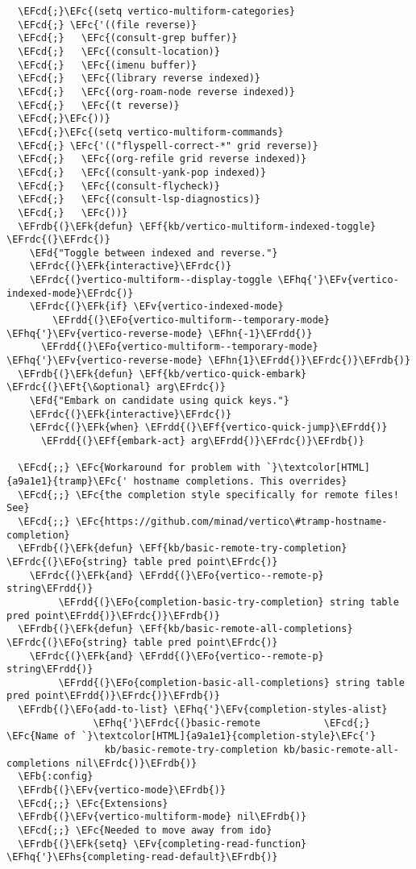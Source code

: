 \documentclass[a4wide,10pt]{article}
\newcommand{\EFc}[1]{\textcolor{EFc}{#1}} %
\newcommand{\EFcd}[1]{\textcolor{EFcd}{#1}} %
\newcommand{\EFd}[1]{\textcolor{EFd}{#1}} %
\newcommand{\EFk}[1]{\textcolor{EFk}{#1}} %
\newcommand{\EFb}[1]{\textcolor{EFb}{#1}} %
\newcommand{\EFf}[1]{\textcolor{EFf}{#1}} %
\newcommand{\EFv}[1]{\textcolor{EFv}{#1}} %
\newcommand{\EFt}[1]{\textcolor{EFt}{#1}} %
\newcommand{\EFo}[1]{\textcolor{EFo}{#1}} %
\newcommand{\EFhn}[1]{\textcolor{EFhn}{\textbf{#1}}} %
\newcommand{\EFhq}[1]{\textcolor{EFhq}{#1}} %
\newcommand{\EFhs}[1]{\textcolor{EFhs}{#1}} %
\newcommand{\EFrdb}[1]{\textcolor{EFrdb}{#1}} %
\newcommand{\EFrdc}[1]{\textcolor{EFrdc}{#1}} %
\newcommand{\EFrdd}[1]{\textcolor{EFrdd}{#1}} %
\begin{document}
\begin{Code}
\begin{Verbatim}
  \EFcd{;}\EFc{(setq vertico-multiform-categories}
  \EFcd{;} \EFc{'((file reverse)}
  \EFcd{;}   \EFc{(consult-grep buffer)}
  \EFcd{;}   \EFc{(consult-location)}
  \EFcd{;}   \EFc{(imenu buffer)}
  \EFcd{;}   \EFc{(library reverse indexed)}
  \EFcd{;}   \EFc{(org-roam-node reverse indexed)}
  \EFcd{;}   \EFc{(t reverse)}
  \EFcd{;}\EFc{))}
  \EFcd{;}\EFc{(setq vertico-multiform-commands}
  \EFcd{;} \EFc{'(("flyspell-correct-*" grid reverse)}
  \EFcd{;}   \EFc{(org-refile grid reverse indexed)}
  \EFcd{;}   \EFc{(consult-yank-pop indexed)}
  \EFcd{;}   \EFc{(consult-flycheck)}
  \EFcd{;}   \EFc{(consult-lsp-diagnostics)}
  \EFcd{;}   \EFc{))}
  \EFrdb{(}\EFk{defun} \EFf{kb/vertico-multiform-indexed-toggle} \EFrdc{(}\EFrdc{)}
    \EFd{"Toggle between indexed and reverse."}
    \EFrdc{(}\EFk{interactive}\EFrdc{)}
    \EFrdc{(}vertico-multiform--display-toggle \EFhq{'}\EFv{vertico-indexed-mode}\EFrdc{)}
    \EFrdc{(}\EFk{if} \EFv{vertico-indexed-mode}
        \EFrdd{(}\EFo{vertico-multiform--temporary-mode} \EFhq{'}\EFv{vertico-reverse-mode} \EFhn{-1}\EFrdd{)}
      \EFrdd{(}\EFo{vertico-multiform--temporary-mode} \EFhq{'}\EFv{vertico-reverse-mode} \EFhn{1}\EFrdd{)}\EFrdc{)}\EFrdb{)}
  \EFrdb{(}\EFk{defun} \EFf{kb/vertico-quick-embark} \EFrdc{(}\EFt{\&optional} arg\EFrdc{)}
    \EFd{"Embark on candidate using quick keys."}
    \EFrdc{(}\EFk{interactive}\EFrdc{)}
    \EFrdc{(}\EFk{when} \EFrdd{(}\EFf{vertico-quick-jump}\EFrdd{)}
      \EFrdd{(}\EFf{embark-act} arg\EFrdd{)}\EFrdc{)}\EFrdb{)}

  \EFcd{;;} \EFc{Workaround for problem with `}\textcolor[HTML]{a9a1e1}{tramp}\EFc{' hostname completions. This overrides}
  \EFcd{;;} \EFc{the completion style specifically for remote files! See}
  \EFcd{;;} \EFc{https://github.com/minad/vertico\#tramp-hostname-completion}
  \EFrdb{(}\EFk{defun} \EFf{kb/basic-remote-try-completion} \EFrdc{(}\EFo{string} table pred point\EFrdc{)}
    \EFrdc{(}\EFk{and} \EFrdd{(}\EFo{vertico--remote-p} string\EFrdd{)}
         \EFrdd{(}\EFo{completion-basic-try-completion} string table pred point\EFrdd{)}\EFrdc{)}\EFrdb{)}
  \EFrdb{(}\EFk{defun} \EFf{kb/basic-remote-all-completions} \EFrdc{(}\EFo{string} table pred point\EFrdc{)}
    \EFrdc{(}\EFk{and} \EFrdd{(}\EFo{vertico--remote-p} string\EFrdd{)}
         \EFrdd{(}\EFo{completion-basic-all-completions} string table pred point\EFrdd{)}\EFrdc{)}\EFrdb{)}
  \EFrdb{(}\EFo{add-to-list} \EFhq{'}\EFv{completion-styles-alist}
               \EFhq{'}\EFrdc{(}basic-remote           \EFcd{;} \EFc{Name of `}\textcolor[HTML]{a9a1e1}{completion-style}\EFc{'}
                 kb/basic-remote-try-completion kb/basic-remote-all-completions nil\EFrdc{)}\EFrdb{)}
  \EFb{:config}
  \EFrdb{(}\EFv{vertico-mode}\EFrdb{)}
  \EFcd{;;} \EFc{Extensions}
  \EFrdb{(}\EFv{vertico-multiform-mode} nil\EFrdb{)}
  \EFcd{;;} \EFc{Needed to move away from ido}
  \EFrdb{(}\EFk{setq} \EFv{completing-read-function} \EFhq{'}\EFhs{completing-read-default}\EFrdb{)}


\end{Verbatim}
\end{Code}
\end{document}
